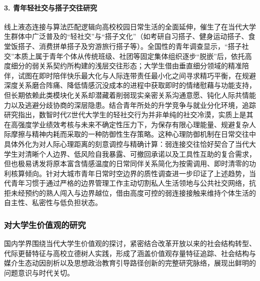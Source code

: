 \paragraph{3. 青年轻社交与搭子交往研究}
线上液态连接与算法匹配逻辑向高校校园日常生活的全面延伸，催生了在当代大学生群体中广泛普及的“轻社交”与“搭子文化”（如考研自习搭子、健身运动搭子、食堂饭搭子、消费拼单搭子及穷游旅行搭子等）。全国性的青年调查显示，“搭子社交”本质上属于青年个体从传统班级、社团等固定集体组织逐步“脱嵌”后，依托高度细分的弱关系契约所构建的浅层交往形态；大学生借由垂直细分领域的精准陪伴，试图在即时陪伴快乐最大化与人际连带责任最小化之间寻求精巧平衡，在规避深度关系磨合阵痛、降低情感沉没成本的进程中获取即时的情绪慰藉与功能支持，但长期依赖此类模块化关系却潜藏着削弱现实亲密关系沟通意愿、钝化人际共情能力以及逃避分歧协商的深层隐患\cite{Lian2024a}。结合青年所处的升学竞争与就业分化环境，追踪研究指出，数智时代Z世代大学生的轻社交行为并非单纯的社交冷漠，实质上是其在高强度学业绩效考核与未来不确定性压力下，为保存有限心理能量、规避复杂人际摩擦与精神内耗而采取的一种防御性生存策略\cite{Sun2023}。这种心理防御机制在日常交往中具体外化为对人际心理距离的刻意调控与精确计算：弱连接交往恰好契合了当代大学生对清晰个人边界、低风险自我暴露、可撤回承诺以及工具性互助的复合需求，但也极易诱发将原本富含情感温度的日常同伴关系简化为按需调用、即时清零的功利核算倾向\cite{LiuHang2023,ChenJiao2024}。针对大城市青年日常时空边界的质性调查进一步印证了上述趋势，当代青年习惯于通过严格的边界管理工作主动切割私人生活领地与公共社交网络，抗拒未经预约的熟人闯入与边界越位，借由高度可控的弱连接接触来维持个体生活的自主性、私密性与低负担状态\cite{Xing2022}。

\subsubsection{对大学生价值观的研究}

国内学界围绕当代大学生价值观的探讨，紧密结合改革开放以来的社会结构转型、代际更替特征与高校立德树人实践，形成了涵盖价值观存量特征追踪、社会结构与媒介生态动因剖析以及思想政治教育引导路径创新的完整研究脉络，展现出鲜明的问题意识与时代关切。


